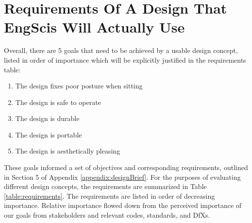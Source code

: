 \documentclass[11pt]{article}
\begin{document}
\section{Requirements Of A Design That EngScis Will Actually Use} %
Overall, there are 5 goals that need to be achieved by a usable design concept, listed in order of importance which will be explicitly justified in the requirements table:
\begin{multicols}{2}
\begin{enumerate} 
    \item The design fixes poor posture when sitting
    \item The design is safe to operate
    \item The design is durable
    \item The design is portable
    \item The design is aesthetically pleasing
\end{enumerate}
\end{multicols}
These goals informed a set of objectives and corresponding requirements, outlined in Section 5 of Appendix \ref{appendix:designBrief}. For the purposes of evaluating different design concepts, the requirements are summarized in Table \ref{table:requirements}. The requirements are listed in order of decreasing importance. Relative importance flowed down from the perceived importance of our goals from stakeholders and relevant codes, standards, and DfXs. 
\end{document}
